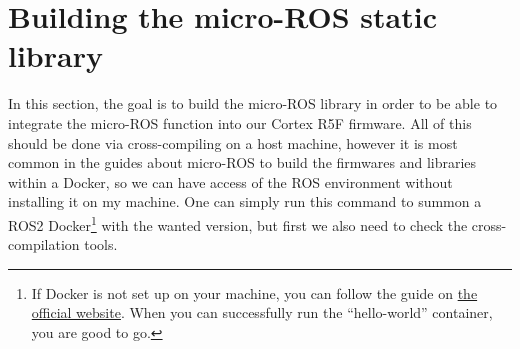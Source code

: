 \documentclass[10pt]{article}
\begin{document}





\section{Building the micro-ROS static library}
In this section, the goal is to build the micro-ROS library in order to be
able to integrate the micro-ROS function into our Cortex R5F firmware.
All of this should be done via cross-compiling on a host machine, however
it is most common in the guides about micro-ROS to build the firmwares and libraries within a Docker,
so we can have access of the ROS environment without installing it on my machine.
One can simply run this command to summon a ROS2 Docker\footnote{If Docker is not set up on your machine, you can follow the guide on \href{https://docs.docker.com/engine/install/ubuntu/}{the official website}. When you can successfully run the ``hello-world'' container, you are good to go.} with the wanted version, but first we also need to check the cross-compilation tools.
\end{document}
